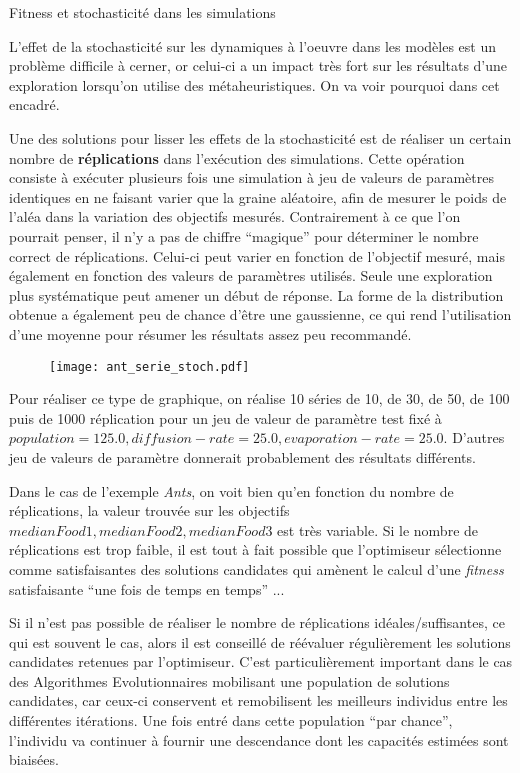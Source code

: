 \begin{testiv}{Fitness et stochasticité dans les simulations}{}

L'effet de la stochasticité sur les dynamiques à l'oeuvre dans les modèles est un problème difficile à cerner, or celui-ci a un impact très fort sur les résultats d'une exploration lorsqu'on utilise des métaheuristiques. On va voir pourquoi dans cet encadré.

Une des solutions pour lisser les effets de la stochasticité est de réaliser un certain nombre de \textbf{réplications} dans l'exécution des simulations. Cette opération consiste à exécuter plusieurs fois une simulation à jeu de valeurs de paramètres identiques en ne faisant varier que la graine aléatoire, afin de mesurer le poids de l'aléa dans la variation des objectifs mesurés. Contrairement à ce que l'on pourrait penser, il n'y a pas de chiffre \enquote{magique} pour déterminer le nombre correct de réplications. Celui-ci peut varier en fonction de l'objectif mesuré, mais également en fonction des valeurs de paramètres utilisés. Seule une exploration plus systématique peut amener un début de réponse. La forme de la distribution obtenue a également peu de chance d'être une gaussienne, ce qui rend l'utilisation d'une moyenne pour résumer les résultats assez peu recommandé.

\begin{figure}[H]
		\centering
	 	\texttt{[image: ant\_serie\_stoch.pdf]}
\end{figure}

Pour réaliser ce type de graphique, on réalise 10 séries de 10, de 30, de 50, de 100 puis de 1000 réplication pour un jeu de valeur de paramètre test fixé à ${population = 125.0, diffusion-rate = 25.0, evaporation-rate = 25.0}$. D'autres jeu de valeurs de paramètre donnerait probablement des résultats différents.

Dans le cas de l'exemple \textit{Ants}, on voit bien qu'en fonction du nombre de réplications, la valeur trouvée sur les objectifs ${medianFood1, medianFood2, medianFood3}$ est très variable. Si le nombre de réplications est trop faible, il est tout à fait possible que l'optimiseur sélectionne comme satisfaisantes des solutions candidates qui amènent le calcul d'une \textit{fitness} satisfaisante \enquote{une fois de temps en temps} ...

Si il n'est pas possible de réaliser le nombre de réplications idéales/suffisantes, ce qui est souvent le cas, alors il est conseillé de réévaluer régulièrement les solutions candidates retenues par l'optimiseur. C'est particulièrement important dans le cas des Algorithmes Evolutionnaires mobilisant une population de solutions candidates, car ceux-ci conservent et remobilisent les meilleurs individus entre les différentes itérations. Une fois entré dans cette population \enquote{par chance}, l'individu va continuer à fournir une descendance dont les capacités estimées sont biaisées.


\end{testiv}
